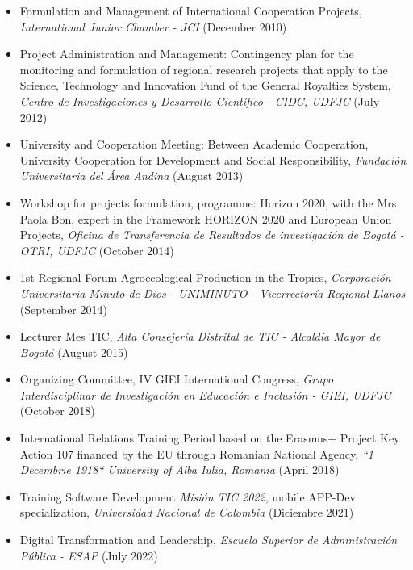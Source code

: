 \documentclass[overlapped,line,final]{res}
\begin{document}
\begin{resume}
\begin{itemize}
	\item Formulation and Management of International Cooperation Projects, \textit{International Junior Chamber - JCI} (December 2010)
	\item Project Administration and Management: Contingency plan for the monitoring and formulation of regional research projects that apply to the Science, Technology and Innovation Fund of the General Royalties System, \textit{Centro de Investigaciones y Desarrollo Científico - CIDC, UDFJC} (July 2012)
	\item University and Cooperation Meeting: Between Academic Cooperation, University Cooperation for Development and Social Responsibility, \textit{Fundación Universitaria del Área Andina} (August 2013)
	\item Workshop for projects formulation, programme: Horizon 2020, with the Mrs. Paola Bon, expert in the Framework HORIZON 2020 and European Union Projects, \textit{Oficina de Transferencia de Resultados de investigación de Bogotá - OTRI, UDFJC} (October 2014)
	\item 1st Regional Forum Agroecological Production in the Tropics, \textit{Corporación Universitaria Minuto de Dios - UNIMINUTO - Vicerrectoría Regional Llanos} (September 2014)
	\item Lecturer Mes TIC, \textit{Alta Consejería Distrital de TIC - Alcaldía Mayor de Bogotá} (August 2015) \href{https://raw.githubusercontent.com/Open-SAI/NemqCV/master/latex/docs/dttConfAlcaldia2015.JPG}{}
	\item Organizing Committee, IV GIEI International Congress, \textit{Grupo Interdisciplinar de Investigación en Educación e Inclusión - GIEI, UDFJC} (October 2018)
	\item International Relations Training Period based on the Erasmus+ Project Key Action 107 financed by the EU through Romanian National Agency, \textit{``1 Decembrie 1918`` University of Alba Iulia, Romania} (April 2018)
	\item Training Software Development \textit{Misión TIC 2022}, mobile APP-Dev specialization, \textit{Universidad Nacional de Colombia} (Diciembre 2021) \href{https://raw.githubusercontent.com/Open-SAI/NemqCV/master/latex/docs/CC_79948255-ProgMINTIC2021.pdf}{}
	\item Digital Transformation and Leadership, \textit{Escuela Superior de Administración Pública - ESAP} (July 2022)  \href{https://raw.githubusercontent.com/Open-SAI/NemqCV/master/latex/docs/esapCert2022.pdf}{}


\end{itemize}
\end{resume}
\end{document}

